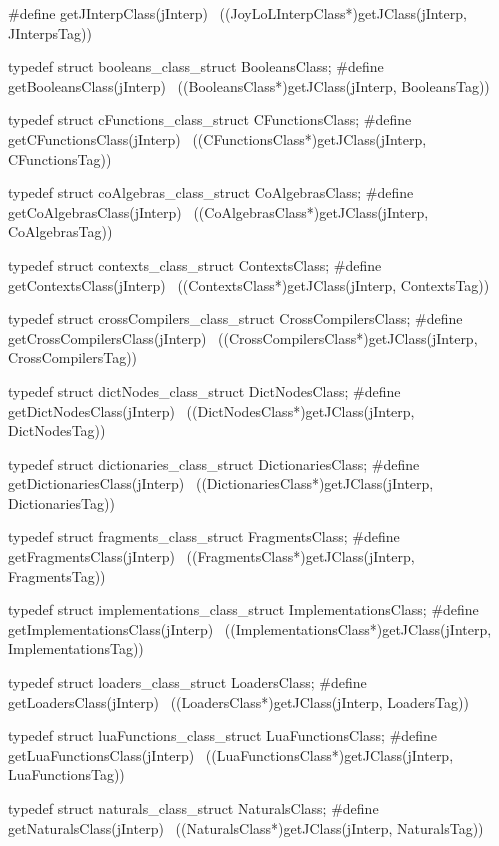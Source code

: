 #define getJInterpClass(jInterp)                            \
  ((JoyLoLInterpClass*)getJClass(jInterp, JInterpsTag))

typedef struct booleans_class_struct BooleansClass;
#define getBooleansClass(jInterp)                           \
  ((BooleansClass*)getJClass(jInterp, BooleansTag))

typedef struct cFunctions_class_struct CFunctionsClass;
#define getCFunctionsClass(jInterp)                         \
  ((CFunctionsClass*)getJClass(jInterp, CFunctionsTag))

typedef struct coAlgebras_class_struct CoAlgebrasClass;
#define getCoAlgebrasClass(jInterp)                         \
  ((CoAlgebrasClass*)getJClass(jInterp, CoAlgebrasTag))

typedef struct contexts_class_struct ContextsClass;
#define getContextsClass(jInterp)                           \
  ((ContextsClass*)getJClass(jInterp, ContextsTag))

typedef struct crossCompilers_class_struct CrossCompilersClass;
#define getCrossCompilersClass(jInterp)                     \
  ((CrossCompilersClass*)getJClass(jInterp, CrossCompilersTag))

typedef struct dictNodes_class_struct DictNodesClass;
#define getDictNodesClass(jInterp)                          \
  ((DictNodesClass*)getJClass(jInterp, DictNodesTag))

typedef struct dictionaries_class_struct DictionariesClass;
#define getDictionariesClass(jInterp)                       \
  ((DictionariesClass*)getJClass(jInterp, DictionariesTag))

typedef struct fragments_class_struct FragmentsClass;
#define getFragmentsClass(jInterp)                          \
  ((FragmentsClass*)getJClass(jInterp, FragmentsTag))

typedef struct implementations_class_struct ImplementationsClass;
#define getImplementationsClass(jInterp)                          \
  ((ImplementationsClass*)getJClass(jInterp, ImplementationsTag))

typedef struct loaders_class_struct LoadersClass;
#define getLoadersClass(jInterp)                            \
  ((LoadersClass*)getJClass(jInterp, LoadersTag))

typedef struct luaFunctions_class_struct LuaFunctionsClass;
#define getLuaFunctionsClass(jInterp)                       \
  ((LuaFunctionsClass*)getJClass(jInterp, LuaFunctionsTag))

typedef struct naturals_class_struct NaturalsClass;
#define getNaturalsClass(jInterp)                           \
  ((NaturalsClass*)getJClass(jInterp, NaturalsTag))

